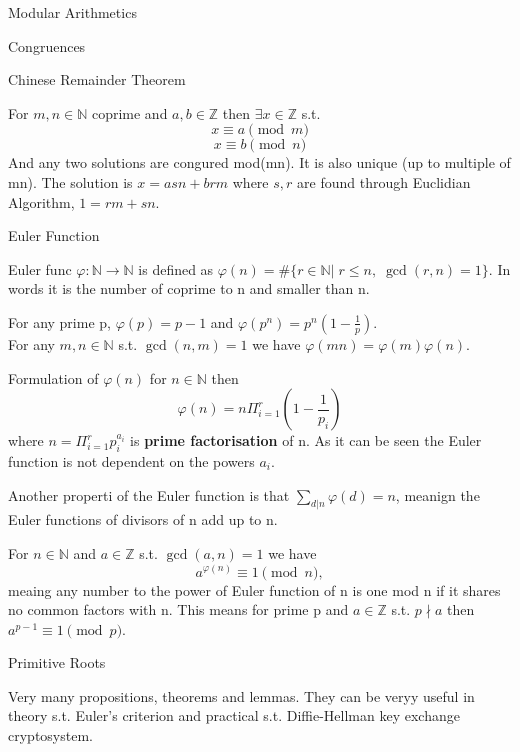 \documentclass[12pt, letterpaper]{article}
\begin{document}
\begin{section}{Modular Arithmetics}
\begin{subsection}{Congruences}
    \begin{subsubsection}{Chinese Remainder Theorem}

      For \(m, n \in \mathbb{N}\) coprime and \(a, b \in \mathbb{Z}\) then
      \(\exists x \in \mathbb{Z}\) s.t. \[x \equiv a \pmod{m}\] \[x \equiv b \pmod{n}\]
      And any two solutions are congured mod(mn). It is also unique (up to multiple of mn).
      The solution is \(x = asn + brm\) where \(s, r\) are found through Euclidian
      Algorithm, \(1 = rm + sn\).

    \end{subsubsection}

  \end{subsection}

  \begin{subsection}{Euler Function}

    Euler func \(\varphi: \mathbb{N} \to \mathbb{N}\) is defined as
    \(\varphi(n) = \#\{ r \in \mathbb{N} | \; r \leq n, \; \gcd(r, n) = 1 \}\).
    In words it is the number of coprime to n and smaller than n.

    For any prime p, \(\varphi(p) = p - 1\) and \(\varphi(p^{n}) = p^{n}(1 - \frac{1}{p})\). \\
    For any \(m, n \in \mathbb{N}\) s.t. \(\gcd(n, m) = 1\) we have
    \(\varphi(mn) = \varphi(m) \varphi(n)\).

    Formulation of \(\varphi(n)\) for \(n \in \mathbb{N}\) then
    \[\varphi(n) = n \Pi^{r}_{i = 1}(1 - \frac{1}{p_{i}})\] where
    \(n = \Pi^{r}_{i = 1} p_{i}^{a_{i}}\) is \textbf{prime factorisation} of n.
    As it can be seen the Euler function is not dependent on the powers \(a_{i}\).

    Another properti of the Euler function is that \(\sum_{d | n} \varphi(d) = n\),
    meanign the Euler functions of divisors of n add up to n.

    For \(n \in \mathbb{N}\) and \(a \in \mathbb{Z}\) s.t. \(\gcd(a, n) = 1\) we
    have \[a^{\varphi(n)} \equiv 1 \pmod{n},\] meaing any number to the power of
    Euler function of n is one mod n if it shares no common factors with n.
    This means for prime p and \(a \in \mathbb{Z}\) s.t. \(p \nmid a\) then
    \(a^{p - 1} \equiv 1 \pmod{p}\).

  \end{subsection}

  \begin{subsection}{Primitive Roots}

    Very many propositions, theorems and lemmas. They can be veryy useful in
    theory s.t. Euler's criterion and practical s.t. Diffie-Hellman key exchange
    cryptosystem.


\end{subsection}
\end{section}
\end{document}
